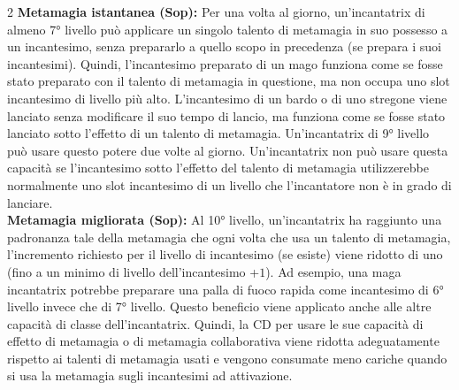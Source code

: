 \documentclass[10pt, a4paper]{report}
\begin{document}
\begin{multicols}{2}
\textbf{Metamagia istantanea (Sop):} Per una volta al giorno, un'incantatrix di almeno 7° livello può applicare un singolo talento di metamagia in suo possesso a un incantesimo, senza prepararlo a quello scopo in precedenza (se prepara i suoi incantesimi). Quindi, l'incantesimo preparato di un mago funziona come se fosse stato preparato con il talento di metamagia in questione, ma non occupa uno slot incantesimo di livello più alto. L'incantesimo di un bardo o di uno stregone viene lanciato senza modificare il suo tempo di lancio, ma funziona come se fosse stato lanciato sotto l'effetto di un talento di metamagia. Un'incantatrix di 9° livello può usare questo potere due volte al giorno. Un'incantatrix non può usare questa capacità se l'incantesimo sotto l'effetto del talento di metamagia utilizzerebbe normalmente uno slot incantesimo di un livello che l'incantatore non è in grado di lanciare.\\

\textbf{Metamagia migliorata (Sop):} Al 10° livello, un'incantatrix ha raggiunto una padronanza tale della metamagia che ogni volta che usa un talento di metamagia, l'incremento richiesto per il livello di incantesimo (se esiste) viene ridotto di uno (fino a un minimo di livello dell'incantesimo +$1$). Ad esempio, una maga incantatrix potrebbe preparare una palla di fuoco rapida come incantesimo di 6° livello invece che di 7° livello.
Questo beneficio viene applicato anche alle altre capacità di classe dell'incantatrix. Quindi, la CD per usare le sue capacità di effetto di metamagia o di metamagia collaborativa viene ridotta adeguatamente rispetto ai talenti di metamagia usati e vengono consumate meno cariche quando si usa la metamagia sugli incantesimi ad attivazione.\\

\end{multicols}
\end{document}
